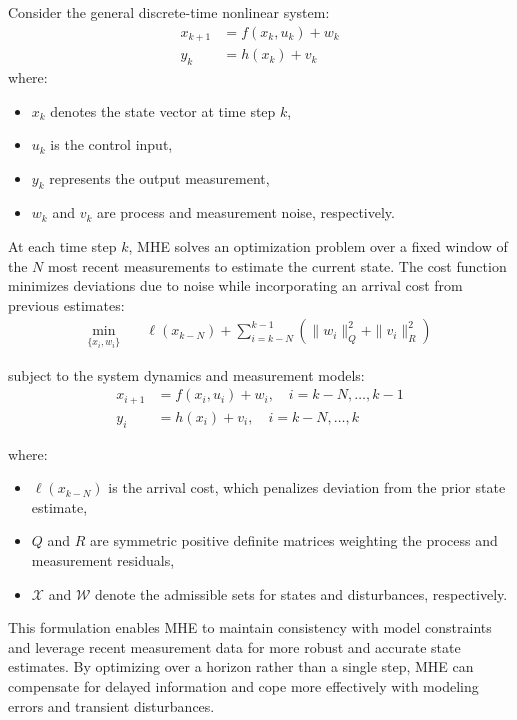 Consider the general discrete-time nonlinear system:
\begin{align}
x_{k+1} &= f(x_k, u_k) + w_k \\
y_k &= h(x_k) + v_k
\end{align}
where:
\begin{itemize}
    \item $x_k$ denotes the state vector at time step $k$,
    \item $u_k$ is the control input,
    \item $y_k$ represents the output measurement,
    \item $w_k$ and $v_k$ are process and measurement noise, respectively.
\end{itemize}

At each time step $k$, MHE solves an optimization problem over a fixed window of the $N$ most recent measurements to estimate the current state. The cost function minimizes deviations due to noise while incorporating an arrival cost from previous estimates:
\begin{align}
\min_{\{x_i, w_i\}} \quad & \ell(x_{k-N}) + \sum_{i=k-N}^{k-1} \left( \|w_i\|_{Q}^{2} + \|v_i\|_{R}^{2} \right)
\end{align}

subject to the system dynamics and measurement models:
\begin{align}
x_{i+1} &= f(x_i, u_i) + w_i, \quad i = k-N, \ldots, k-1 \\
y_i &= h(x_i) + v_i, \quad i = k-N, \ldots, k
\end{align}

where:
\begin{itemize}
    \item $\ell(x_{k-N})$ is the arrival cost, which penalizes deviation from the prior state estimate,
    \item $Q$ and $R$ are symmetric positive definite matrices weighting the process and measurement residuals,
    \item $\mathcal{X}$ and $\mathcal{W}$ denote the admissible sets for states and disturbances, respectively.
\end{itemize}

This formulation enables MHE to maintain consistency with model constraints and leverage recent measurement data for more robust and accurate state estimates. By optimizing over a horizon rather than a single step, MHE can compensate for delayed information and cope more effectively with modeling errors and transient disturbances.


